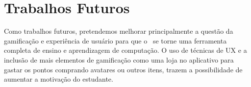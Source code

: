 \section{Trabalhos Futuros}

Como trabalhos futuros, pretendemos melhorar principalmente a questão da gamificação e experiência de usuário para que o \appName\ se torne uma ferramenta completa de ensino e aprendizagem de computação. O uso de técnicas de UX \cite{ux} e a inclusão de mais elementos de gamificação \cite{gamification_motivates} como uma loja no aplicativo para gastar os pontos comprando avatares ou outros itens, trazem a possibilidade de aumentar a motivação do estudante.
